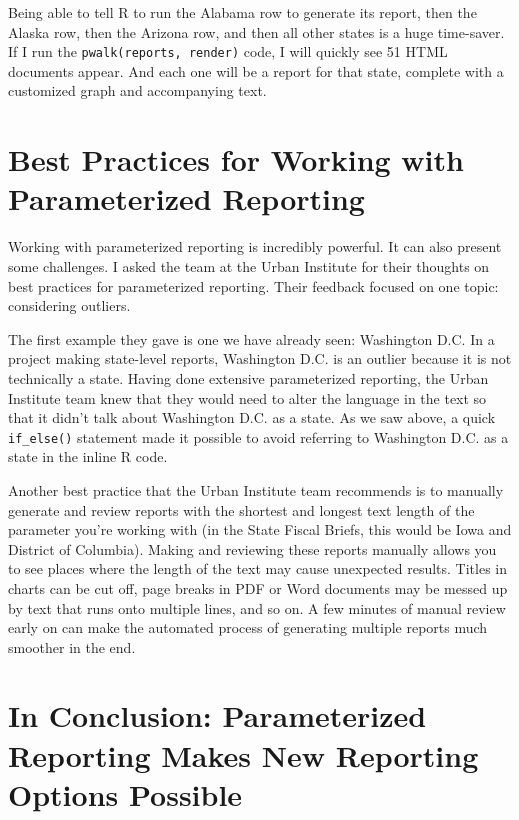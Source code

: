 \documentclass[
]{book}
\begin{document}
Being able to tell R to run the Alabama row to generate its report, then the Alaska row, then the Arizona row, and then all other states is a huge time-saver. If I run the \texttt{pwalk(reports,\ render)} code, I will quickly see 51 HTML documents appear. And each one will be a report for that state, complete with a customized graph and accompanying text.

\hypertarget{best-practices-for-working-with-parameterized-reporting}{%
\section*{Best Practices for Working with Parameterized Reporting}\label{best-practices-for-working-with-parameterized-reporting}}

Working with parameterized reporting is incredibly powerful. It can also present some challenges. I asked the team at the Urban Institute for their thoughts on best practices for parameterized reporting. Their feedback focused on one topic: considering outliers.

The first example they gave is one we have already seen: Washington D.C. In a project making state-level reports, Washington D.C. is an outlier because it is not technically a state. Having done extensive parameterized reporting, the Urban Institute team knew that they would need to alter the language in the text so that it didn't talk about Washington D.C. as a state. As we saw above, a quick \texttt{if\_else()} statement made it possible to avoid referring to Washington D.C. as a state in the inline R code.

Another best practice that the Urban Institute team recommends is to manually generate and review reports with the shortest and longest text length of the parameter you're working with (in the State Fiscal Briefs, this would be Iowa and District of Columbia). Making and reviewing these reports manually allows you to see places where the length of the text may cause unexpected results. Titles in charts can be cut off, page breaks in PDF or Word documents may be messed up by text that runs onto multiple lines, and so on. A few minutes of manual review early on can make the automated process of generating multiple reports much smoother in the end.

\hypertarget{in-conclusion-parameterized-reporting-makes-new-reporting-options-possible}{%
\section*{In Conclusion: Parameterized Reporting Makes New Reporting Options Possible}\label{in-conclusion-parameterized-reporting-makes-new-reporting-options-possible}}
\end{document}

